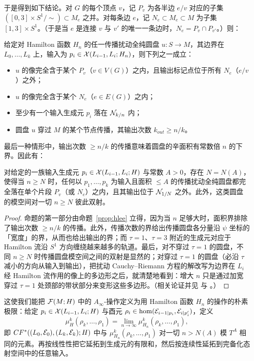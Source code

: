 于是得到如下结论。对 $G$ 的每个顶点 $v$，记 $P_v$ 为各半边 $e/v$ 对应的子集 $([0,3]\times S^1/\!\sim)\subset M_e$ 之并。对每条边 $e$，记 $N_e\subset M_e\subset M$ 为子集 $[1,3]\times S^1$。（于是当 $e$ 是连接 $v$ 与 $v'$ 的唯一一条边时，$N_e=P_v\cap P_{v'}$。）则：

\begin{prop}\label{prop:hlee}
给定对 Hamilton 函数 $H_n$ 的任一传播扰动全纯圆盘 $u:S\to M$，其边界在 $L_0,\dots,L_k$ 上，输入为 $p_i\in\mathcal{X}(L_{i-1},L_i;H_n)$，则下列之一成立：
\begin{itemize}
\item $u$ 的像完全含于某个 $P_v$（$v\in V(G)$）之内，且输出标记点位于所有 $N_e$（$e/v$）之外；
\item $u$ 的像完全含于某个 $N_e$（$e\in E(G)$）之内；
\item 至少有一个输入生成元 $p_i$ 落在 $\mathcal{N}_{k/n}$ 内；
\item 圆盘 $u$ 穿过 $M$ 的某个节点传播，其输出次数 $k_{out}\geq n/k$。
\end{itemize}
\end{prop}

最后一种情形中，输出次数 $\geq n/k$ 的传播意味着圆盘的辛面积有常数倍 $n$ 的下界。因此有：

\begin{prop}\label{prop:lowarealocal}
对给定的一族输入生成元 $p_i\in\mathcal{X}(L_{i-1},L_i;H)$ 与常数 $A>0$，存在 $N=N(A)$，使得当 $n\geq N$ 时，任何以 $p_1,\dots,p_k$ 为输入且面积 $\leq A$ 的传播扰动全纯圆盘都完全落在单个片段 $P_v$（或 $N_e$）之内，且其输出位于 $\mathcal{N}_{1/N}$ 之外。此外，这类圆盘的模空间对一切 $n\geq N$ 彼此双射。
\end{prop}

\begin{proof}
命题的第一部分由命题~\ref{prop:hlee} 立得，因为当 $n$ 足够大时，面积界排除了输出次数 $\geq n/k$ 的传播。此外，传播次数的界给出传播圆盘各分量沿 $\psi$ 坐标的「宽度」的界，从而也给出输出的界；而 $\tau=1$、$\tau=3$ 附近的生成元对应于 Hamilton 流沿 $S^1$ 方向缠绕越来越多的轨道。最后，对不穿过 $\tau=1$ 的圆盘，不同 $n\geq N$ 时传播圆盘模空间之间的双射是显然的；对穿过 $\tau=1$ 的圆盘（必沿 $\tau$ 减小的方向从输入到输出），把扰动 Cauchy--Riemann 方程的解改写为边界在 $L_i$ 经 Hamilton 流作用的像上的多边形之后，就清楚地看到：增大 $n$ 只是通过加宽穿过 $\tau=1$ 处颈部的带状部分来变形这些多边形。（相关论证并见 \cite[Section 3]{Lee} 与 \cite[Section 5]{AuSm}。）
\end{proof}

这使我们能把 $\mathcal{F}(M;H)$ 中的 $A_\infty$-操作定义为用 Hamilton 函数 $H_n$ 的操作的朴素极限：给定 $p_i\in\mathcal{X}(L_{i-1},L_i;H)$ 与酉元 $\rho_i\in\hom(\mathcal{E}_{i-1|p_i},\mathcal{E}_{i|p'_i})$，定义
\begin{equation}\label{eq:mu_k_H}
\mu^k_H(\rho_k,\dots,\rho_1)=\lim_{n\to \infty} \mu^k_{H_n}(\rho_k,\dots,\rho_1),
\end{equation}
即 $CF^*((L_0,\mathcal{E}_0),(L_k,\mathcal{E}_k);H)$ 中与 $\mu^k_{H_n}(\rho_k,\dots,\rho_1)$ 对一切 $n>N(A)$ 模 $T^A$ 相同的元素。再按线性性把它延拓到生成元的有限和，然后按连续性延拓到完备化态射空间中的任意输入。

